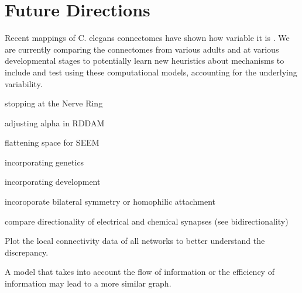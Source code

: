 \section{Future Directions}

Recent mappings of C. elegans connectomes have shown how variable it is \citep{Witvliet}. We are currently comparing the connectomes from various adults and at various developmental stages to potentially learn new heuristics about mechanisms to include and test using these computational models, accounting for the underlying variability. 

stopping at the Nerve Ring

adjusting alpha in RDDAM

flattening space for SEEM

incorporating genetics

incorporating development

incoroporate bilateral symmetry or homophilic attachment

compare directionality of electrical and chemical synapses (see bidirectionality)

Plot the local connectivity data of all networks to better understand the discrepancy.

A model that takes into account the flow of information or the efficiency of information may lead to a more similar graph.
